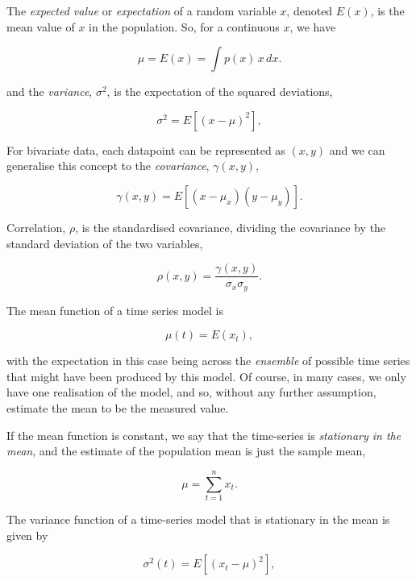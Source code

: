 The \emph{expected value} or \emph{expectation} of a random variable
$x$, denoted $E(x)$, is the mean value of $x$ in the population. So,
for a continuous $x$, we have

\begin{equation}
\mu = E(x) = \int p(x) \, x \, dx.
\end{equation}

\noindent
and the \emph{variance}, $\sigma^2$, is the expectation of the squared
deviations,

\begin{equation}
\sigma^2 = E[(x - \mu)^2],
\end{equation}

For bivariate data, each datapoint can be represented as $(x, y)$ and
we can generalise this concept to the \emph{covariance},
$\gamma(x, y)$,

\begin{equation}
\gamma(x, y) = E[(x - \mu_x)(y - \mu_y)].
\end{equation}

\noindent
Correlation, $\rho$, is the standardised covariance, dividing the
covariance by the standard deviation of the two variables,

\begin{equation}
\rho(x, y) = \frac{\gamma(x, y)}{\sigma_x \sigma_y}.
\end{equation}

\noindent
The mean function of a time series model is

\begin{equation}
\mu(t) = E(x_t),
\end{equation}

\noindent
with the expectation in this case being across the \emph{ensemble} of
possible time series that might have been produced by this model. Of
course, in many cases, we only have one realisation of the model, and
so, without any further assumption, estimate the mean to be the
measured value.

If the mean function is constant, we say that the time-series is
\emph{stationary in the mean}, and the estimate of the population mean
is just the sample mean,

\begin{equation}
\mu = \sum^n_{t=1} x_t.
\end{equation}

\noindent
The variance function of a time-series model that is stationary in the
mean is given by

\begin{equation}
\sigma^2(t) = E[(x_t - \mu)^2],
\end{equation}


